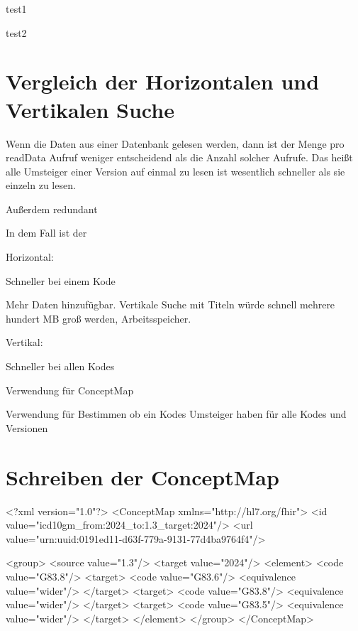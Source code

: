 \begin{minipage}[t]{.5\textwidth}
test1
\end{minipage}
\begin{minipage}[t]{.5\textwidth}
test2
\end{minipage}



\section{Vergleich der Horizontalen und Vertikalen Suche}

Wenn die Daten aus einer Datenbank gelesen werden, dann ist der Menge pro readData Aufruf weniger entscheidend als die Anzahl solcher Aufrufe. Das heißt alle Umsteiger einer Version auf einmal zu lesen ist wesentlich schneller als sie einzeln zu lesen. 

Außerdem redundant

In dem Fall ist der

Horizontal:

Schneller bei einem Kode

Mehr Daten hinzufügbar. Vertikale Suche mit Titeln würde schnell mehrere hundert MB groß werden, Arbeitsspeicher.

Vertikal:

Schneller bei allen Kodes

Verwendung für ConceptMap

Verwendung für Bestimmen ob ein Kodes Umsteiger haben für alle Kodes und Versionen

\section{Schreiben der ConceptMap}

\begin{Code}
<?xml version="1.0"?>
<ConceptMap xmlns="http://hl7.org/fhir">
  <id value="icd10gm_from:2024_to:1.3_target:2024"/>
  <url value="urn:uuid:0191ed11-d63f-779a-9131-77d4ba9764f4"/>



<group>
  <source value="1.3"/>
  <target value="2024"/>
 <element>
    <code value="G83.8"/>
    <target>
      <code value="G83.6"/>
      <equivalence value="wider"/>
    </target>
    <target>
      <code value="G83.8"/>
      <equivalence value="wider"/>
    </target>
    <target>
      <code value="G83.5"/>
      <equivalence value="wider"/>
    </target>
  </element>
</group>
</ConceptMap>
\end{Code}

